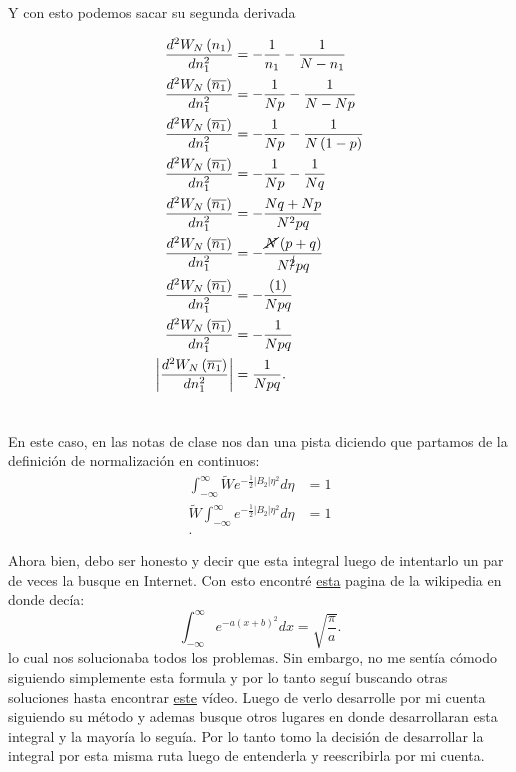 \documentclass{report}
\begin{document}
  Y con esto podemos sacar su segunda derivada
  
  \begin{align*}
    \frac{d^2W_N\left( n_1 \right) }{d n_1^2} &=  - \frac{1}{n_1} - \frac{1}{N - n_1}\\
    \frac{d^2 W_N\left( \overline{n_1} \right) }{d n_1^2} &= - \frac{1}{Np} - \frac{1}{N - Np} \\
    \frac{d^2 W_N\left( \overline{n_1} \right) }{d n_1^2} &= - \frac{1}{Np} - \frac{1}{N\left( 1 - p \right) } \\
    \frac{d^2 W_N\left( \overline{n_1} \right) }{d n_1^2} &= - \frac{1}{Np} - \frac{1}{Nq } \\
    \frac{d^2 W_N\left( \overline{n_1} \right) }{d n_1^2} &= - \frac{Nq + Np}{N^2pq}\\
  \frac{d^2 W_N\left( \overline{n_1} \right) }{d n_1^2} &= - \frac{\cancel{N}\left( p + q \right) }{N^{\cancel{2}}pq}\\
    \frac{d^2 W_N\left( \overline{n_1} \right) }{d n_1^2} &= - \frac{\left( 1\right) }{Npq}\\
    \frac{d^2 W_N\left( \overline{n_1} \right) }{d n_1^2} &= - \frac{1}{Npq}\\
    \left|  \frac{d^2 W_N\left( \overline{n_1} \right) }{d n_1^2} \right|  &=  \frac{1}{Npq}
  .\end{align*}

\section{}

En este caso, en las notas de clase nos dan una pista diciendo que partamos de la definición de normalización en continuos:
\begin{align*}
  \int_{-\infty}^{\infty} \tilde{W} e^{-\frac{1}{2}\left| B_2 \right| \eta^2} d\eta &= 1 \\
  \tilde{W} \int_{-\infty}^{\infty} e^{-\frac{1}{2}\left| B_2 \right| \eta^2} d\eta &= 1 \\
.\end{align*}

Ahora bien, debo ser honesto y decir que esta integral luego de intentarlo un par de veces la busque en Internet. Con esto encontré \href{https://es.wikipedia.org/wiki/Integral_de_Gauss}{esta} pagina de la wikipedia en donde decía: \[
\int_{-\infty}^{\infty} e^{-a \left( x + b \right)^2}dx = \sqrt{\frac{\pi}{a}} 
.\] lo cual nos solucionaba todos los problemas. Sin embargo, no me sentía cómodo siguiendo simplemente esta formula y por lo tanto seguí buscando otras soluciones hasta encontrar \href{https://youtu.be/qNfj96GcLJQ?si=QGbjJLlPIro5kT6y}{este} vídeo. Luego de verlo desarrolle por mi cuenta siguiendo su método y ademas busque otros lugares en donde desarrollaran esta integral y la mayoría lo seguía. Por lo tanto tomo la decisión de desarrollar la integral por esta misma ruta luego de entenderla y reescribirla por mi cuenta. 
\end{document}
